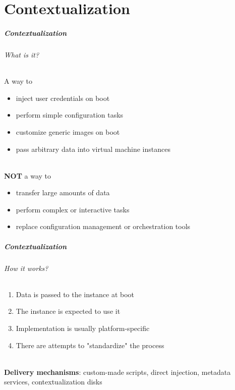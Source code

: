 \part{Contextualization}

\begin{frame}
  \frametitle{Contextualization}
  \framesubtitle{What is it?}

  A way to
  \begin{itemize}
    \item inject user credentials on boot
    \item perform simple configuration tasks
    \item customize generic images on boot
    \item pass arbitrary data into virtual machine instances
  \end{itemize}

  \hfill\\

  \textbf{NOT} a way to
  \begin{itemize}
    \item transfer large amounts of data
    \item perform complex or interactive tasks
    \item replace configuration management or orchestration tools
  \end{itemize}
\end{frame}

\begin{frame}
  \frametitle{Contextualization}
  \framesubtitle{How it works?}

  \begin{enumerate}
    \item Data is passed to the instance at boot
    \item The instance is expected to use it
    \item Implementation is usually platform-specific
    \item There are attempts to "standardize" the process
  \end{enumerate}

  \hfill\\

  \textbf{Delivery mechanisms}: custom-made scripts, direct injection, metadata services, contextualization disks
\end{frame}

